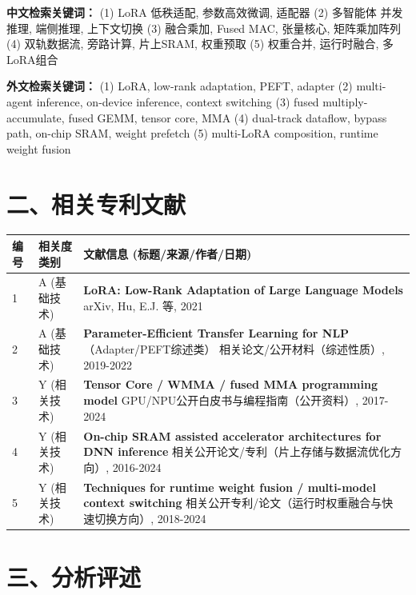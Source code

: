 \documentclass[12pt,a4paper]{article}
\begin{document}
\textbf{中文检索关键词：}
(1) LoRA 低秩适配, 参数高效微调, 适配器
(2) 多智能体 并发推理, 端侧推理, 上下文切换
(3) 融合乘加, Fused MAC, 张量核心, 矩阵乘加阵列
(4) 双轨数据流, 旁路计算, 片上SRAM, 权重预取
(5) 权重合并, 运行时融合, 多LoRA组合

\textbf{外文检索关键词：}
(1) LoRA, low-rank adaptation, PEFT, adapter
(2) multi-agent inference, on-device inference, context switching
(3) fused multiply-accumulate, fused GEMM, tensor core, MMA
(4) dual-track dataflow, bypass path, on-chip SRAM, weight prefetch
(5) multi-LoRA composition, runtime weight fusion

\section*{二、相关专利文献}

\renewcommand{\arraystretch}{1.5}
\begin{longtable}{|p{1.5cm}|p{6cm}|p{7.5cm}|}
\hline
\textbf{编号} & \textbf{相关度类别} & \textbf{文献信息 (标题/来源/作者/日期)} \\
\hline
1 & A (基础技术) & \textbf{LoRA: Low-Rank Adaptation of Large Language Models} \newline arXiv, Hu, E.J. 等, 2021 \\
\hline
2 & A (基础技术) & \textbf{Parameter-Efficient Transfer Learning for NLP}（Adapter/PEFT综述类） \newline 相关论文/公开材料（综述性质）, 2019-2022 \\
\hline
3 & Y (相关技术) & \textbf{Tensor Core / WMMA / fused MMA programming model} \newline GPU/NPU公开白皮书与编程指南（公开资料）, 2017-2024 \\
\hline
4 & Y (相关技术) & \textbf{On-chip SRAM assisted accelerator architectures for DNN inference} \newline 相关公开论文/专利（片上存储与数据流优化方向）, 2016-2024 \\
\hline
5 & Y (相关技术) & \textbf{Techniques for runtime weight fusion / multi-model context switching} \newline 相关公开专利/论文（运行时权重融合与快速切换方向）, 2018-2024 \\
\hline
\end{longtable}

\section*{三、分析评述}
\end{document}
